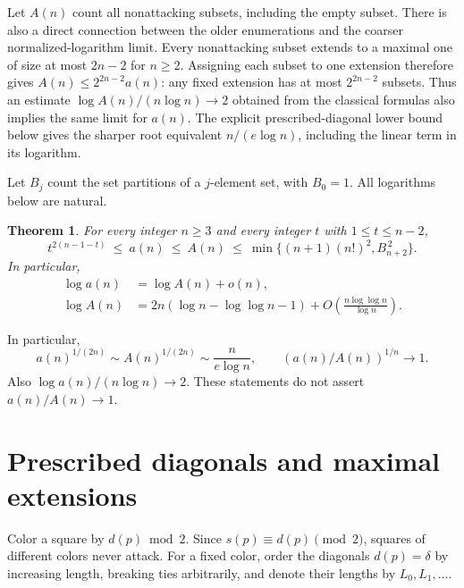 \documentclass[11pt]{article}
\newtheorem{theorem}{Theorem}
\begin{document}
Let $A(n)$ count all nonattacking subsets, including the empty subset.
There is also a direct connection between the older enumerations and
the coarser normalized-logarithm limit. Every nonattacking subset
extends to a maximal one of size at most $2n-2$ for $n\geq2$.
Assigning each subset to one extension therefore gives
$A(n)\leq2^{2n-2}a(n)$: any fixed extension has at most $2^{2n-2}$
subsets. Thus an estimate $\log A(n)/(n\log n)\to2$ obtained from
the classical formulas also implies the same limit for $a(n)$.
The explicit prescribed-diagonal lower bound below gives the sharper
root equivalent $n/(e\log n)$, including the linear term in its logarithm.

Let $B_j$ count the set partitions of a $j$-element set, with $B_0=1$.
All logarithms below are natural.

\begin{theorem}\label{thm:main}
For every integer $n\geq3$ and every integer $t$ with $1\leq t\leq n-2$,
\begin{equation}\label{eq:bounds}
 t^{2(n-1-t)}\ \leq\ a(n)\ \leq\ A(n)\ \leq\
 \min\{(n+1)(n!)^2,B_{n+2}^{\,2}\}.
\end{equation}
In particular,
\begin{equation}\label{eq:limit}
 \begin{aligned}
 \log a(n)&=\log A(n)+o(n),\\
 \log A(n)&=2n(\log n-\log\log n-1)
   +O\!\left(\frac{n\log\log n}{\log n}\right).
 \end{aligned}
\end{equation}
\end{theorem}

In particular,
\[
 a(n)^{1/(2n)}\sim A(n)^{1/(2n)}\sim\frac{n}{e\log n},\qquad
 (a(n)/A(n))^{1/n}\to1.
\]
Also $\log a(n)/(n\log n)\to2$.
These statements do not assert $a(n)/A(n)\to1$.

\section{Prescribed diagonals and maximal extensions}
Color a square by $d(p)\bmod2$.
Since $s(p)\equiv d(p)\pmod2$, squares of different colors never attack.
For a fixed color, order the diagonals $d(p)=\delta$ by increasing length,
breaking ties arbitrarily, and denote their lengths by $L_0,L_1,\ldots$.
\end{document}
